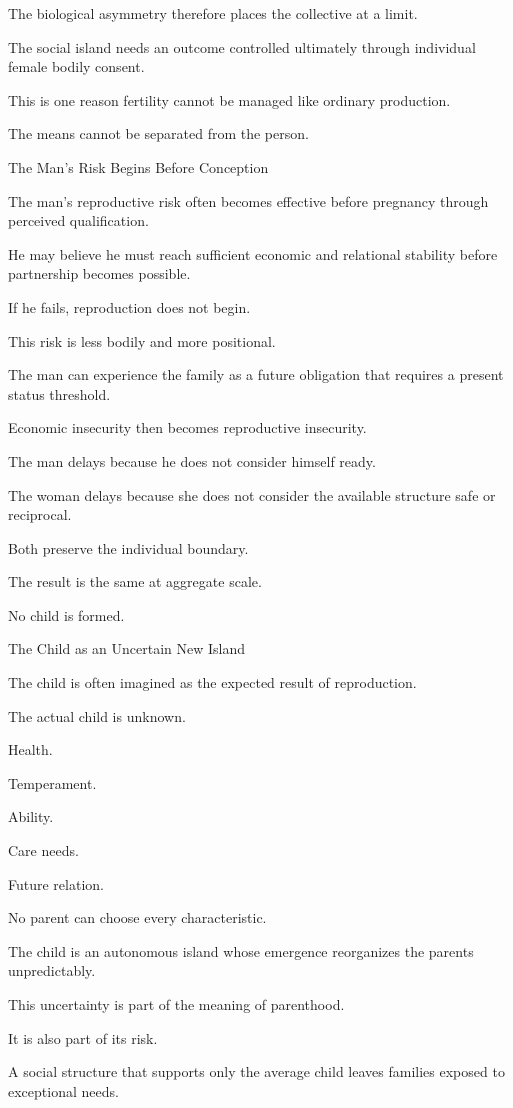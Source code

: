 The biological asymmetry therefore places the collective at a limit.

The social island needs an outcome controlled ultimately through individual female bodily consent.

This is one reason fertility cannot be managed like ordinary production.

The means cannot be separated from the person.

The Man’s Risk Begins Before Conception

The man’s reproductive risk often becomes effective before pregnancy through perceived qualification.

He may believe he must reach sufficient economic and relational stability before partnership becomes possible.

If he fails, reproduction does not begin.

This risk is less bodily and more positional.

The man can experience the family as a future obligation that requires a present status threshold.

Economic insecurity then becomes reproductive insecurity.

The man delays because he does not consider himself ready.

The woman delays because she does not consider the available structure safe or reciprocal.

Both preserve the individual boundary.

The result is the same at aggregate scale.

No child is formed.

The Child as an Uncertain New Island

The child is often imagined as the expected result of reproduction.

The actual child is unknown.

Health.

Temperament.

Ability.

Care needs.

Future relation.

No parent can choose every characteristic.

The child is an autonomous island whose emergence reorganizes the parents unpredictably.

This uncertainty is part of the meaning of parenthood.

It is also part of its risk.

A social structure that supports only the average child leaves families exposed to exceptional needs.

